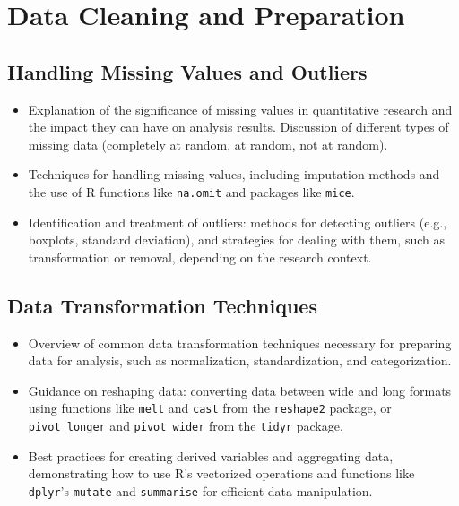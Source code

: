 \documentclass[
]{book}
\begin{document}
\hypertarget{data-cleaning-and-preparation}{%
\section*{Data Cleaning and Preparation}\label{data-cleaning-and-preparation}}

\hypertarget{handling-missing-values-and-outliers}{%
\subsection*{Handling Missing Values and Outliers}\label{handling-missing-values-and-outliers}}

\begin{itemize}
\item
  Explanation of the significance of missing values in quantitative research and the impact they can have on analysis results. Discussion of different types of missing data (completely at random, at random, not at random).
\item
  Techniques for handling missing values, including imputation methods and the use of R functions like \texttt{na.omit} and packages like \texttt{mice}.
\item
  Identification and treatment of outliers: methods for detecting outliers (e.g., boxplots, standard deviation), and strategies for dealing with them, such as transformation or removal, depending on the research context.
\end{itemize}

\hypertarget{data-transformation-techniques}{%
\subsection*{Data Transformation Techniques}\label{data-transformation-techniques}}

\begin{itemize}
\item
  Overview of common data transformation techniques necessary for preparing data for analysis, such as normalization, standardization, and categorization.
\item
  Guidance on reshaping data: converting data between wide and long formats using functions like \texttt{melt} and \texttt{cast} from the \texttt{reshape2} package, or \texttt{pivot\_longer} and \texttt{pivot\_wider} from the \texttt{tidyr} package.
\item
  Best practices for creating derived variables and aggregating data, demonstrating how to use R's vectorized operations and functions like \texttt{dplyr}'s \texttt{mutate} and \texttt{summarise} for efficient data manipulation.
\end{itemize}
\end{document}
